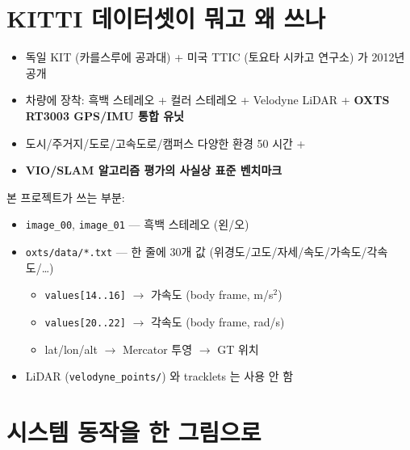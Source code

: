 \documentclass[11pt,a4paper,oneside]{report}
\begin{document}
\section{KITTI 데이터셋이 뭐고 왜 쓰나}

\begin{itemize}
\item 독일 KIT (카를스루에 공과대) + 미국 TTIC (토요타 시카고 연구소) 가 2012년 공개
\item 차량에 장착: 흑백 스테레오 + 컬러 스테레오 + Velodyne LiDAR + \textbf{OXTS RT3003 GPS/IMU 통합 유닛}
\item 도시/주거지/도로/고속도로/캠퍼스 다양한 환경 50 시간 +
\item \textbf{VIO/SLAM 알고리즘 평가의 사실상 표준 벤치마크}
\end{itemize}

본 프로젝트가 쓰는 부분:
\begin{itemize}
\item \texttt{image\_00}, \texttt{image\_01} — 흑백 스테레오 (왼/오)
\item \texttt{oxts/data/*.txt} — 한 줄에 30개 값 (위경도/고도/자세/속도/가속도/각속도/\ldots)
  \begin{itemize}\small
  \item \texttt{values[14..16]} \(\to\) 가속도 (body frame, m/s\(^2\))
  \item \texttt{values[20..22]} \(\to\) 각속도 (body frame, rad/s)
  \item lat/lon/alt \(\to\) Mercator 투영 \(\to\) GT 위치
  \end{itemize}
\item LiDAR (\texttt{velodyne\_points/}) 와 tracklets 는 사용 안 함
\end{itemize}

\section{시스템 동작을 한 그림으로}
\end{document}
